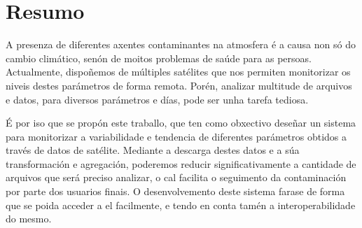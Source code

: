 \pagestyle{plain}
\chapter*{Resumo}
A presenza de diferentes axentes contaminantes na atmosfera é a causa non só do cambio climático, senón de moitos problemas de saúde para as persoas. Actualmente, dispoñemos de múltiples satélites
que nos permiten monitorizar os niveis destes parámetros de forma remota. Porén, analizar multitude de arquivos e datos, para diversos parámetros e días, pode ser unha tarefa tediosa.

É por iso que se propón este traballo, que ten como obxectivo deseñar un sistema para monitorizar a variabilidade e tendencia de diferentes parámetros obtidos a través de datos de satélite.
Mediante a descarga destes datos e a súa transformación e agregación, poderemos reducir significativamente a cantidade de arquivos que será preciso analizar, o cal facilita o seguimento da
contaminación por parte dos usuarios finais. O desenvolvemento deste sistema farase de forma que se poida acceder a el facilmente, e tendo en conta tamén a interoperabilidade do mesmo.